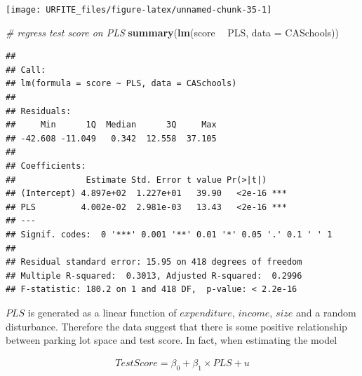 \documentclass[]{book}
\newenvironment{Shaded}{\begin{snugshade}}{\end{snugshade}}
\newcommand{\KeywordTok}[1]{\textcolor[rgb]{0.13,0.29,0.53}{\textbf{#1}}}
\newcommand{\DataTypeTok}[1]{\textcolor[rgb]{0.13,0.29,0.53}{#1}}
\newcommand{\DecValTok}[1]{\textcolor[rgb]{0.00,0.00,0.81}{#1}}
\newcommand{\StringTok}[1]{\textcolor[rgb]{0.31,0.60,0.02}{#1}}
\newcommand{\CommentTok}[1]{\textcolor[rgb]{0.56,0.35,0.01}{\textit{#1}}}
\newcommand{\OperatorTok}[1]{\textcolor[rgb]{0.81,0.36,0.00}{\textbf{#1}}}
\newcommand{\NormalTok}[1]{#1}
\theoremstyle{definition}
\theoremstyle{definition}
\theoremstyle{definition}
\theoremstyle{remark}
\begin{document}
\begin{Shaded}
\end{Shaded}

\begin{center}\texttt{[image: URFITE\_files/figure-latex/unnamed-chunk-35-1]} \end{center}

\begin{Shaded}
\begin{Highlighting}[]
\CommentTok{# regress test score on PLS}
\KeywordTok{summary}\NormalTok{(}\KeywordTok{lm}\NormalTok{(score }\OperatorTok{~}\StringTok{ }\NormalTok{PLS, }\DataTypeTok{data =}\NormalTok{ CASchools))}
\end{Highlighting}
\end{Shaded}

\begin{verbatim}
## 
## Call:
## lm(formula = score ~ PLS, data = CASchools)
## 
## Residuals:
##     Min      1Q  Median      3Q     Max 
## -42.608 -11.049   0.342  12.558  37.105 
## 
## Coefficients:
##              Estimate Std. Error t value Pr(>|t|)    
## (Intercept) 4.897e+02  1.227e+01   39.90   <2e-16 ***
## PLS         4.002e-02  2.981e-03   13.43   <2e-16 ***
## ---
## Signif. codes:  0 '***' 0.001 '**' 0.01 '*' 0.05 '.' 0.1 ' ' 1
## 
## Residual standard error: 15.95 on 418 degrees of freedom
## Multiple R-squared:  0.3013, Adjusted R-squared:  0.2996 
## F-statistic: 180.2 on 1 and 418 DF,  p-value: < 2.2e-16
\end{verbatim}

\(PLS\) is generated as a linear function of \(expenditure\),
\(income\), \(size\) and a random disturbance. Therefore the data
suggest that there is some positive relationship between parking lot
space and test score. In fact, when estimating the model

\begin{align}
TestScore = \beta_0 + \beta_1 \times PLS + u \label{eq:plsmod} 
\end{align}
\end{document}
